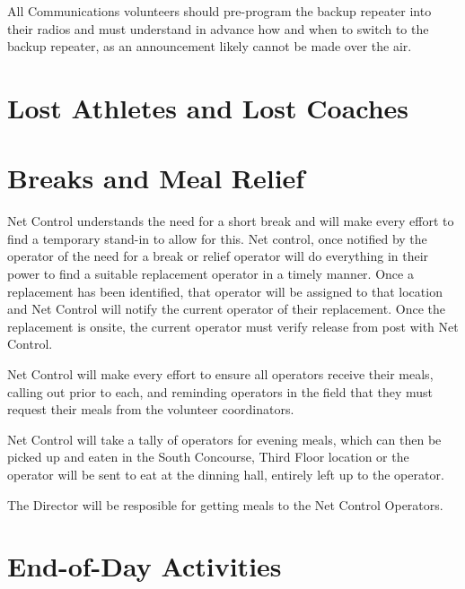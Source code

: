 \documentclass[pdflatex,letterpaper,twoside,12pt]{book}
\begin{document}
All Communications volunteers should pre-program the backup repeater into their radios and must understand in advance how and when to switch to the backup repeater, as an announcement likely cannot be made over the air.


\section{Lost Athletes and Lost Coaches}


\section{Breaks and Meal Relief}

Net Control understands the need for a short break and will make every effort to find a temporary stand-in to allow for this.  Net control, once notified by the operator of the need for a break or relief operator will do everything in their power to find a suitable replacement operator in a timely manner.  Once a replacement has been identified, that operator will be assigned to that location and Net Control will notify the current operator of their replacement.  Once the replacement is onsite, the current operator must verify release from post with Net Control.

Net Control will make every effort to ensure all operators receive their meals, calling out prior to each, and reminding operators in the field that they must request their meals from the volunteer coordinators. 

Net Control will take a tally of operators for evening meals, which can then be picked up and eaten in the South Concourse, Third Floor location or the operator will be sent to eat at the dinning hall, entirely left up to the operator.

The Director will be resposible for getting meals to the Net Control Operators.



\section{End-of-Day Activities}
\end{document}
